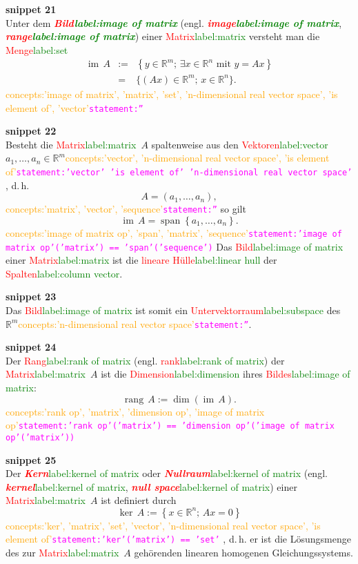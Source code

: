 \documentclass[a4paper,twoside,english,ngerman,deutsch,german,sectrefs,envcountsame,envcountchap]{svmono}
\newcommand{\setref}[2]{\textcolor{red}{#1}\textcolor{green}{#2}}
\newcommand{\snippet}[1]{\textbf{snippet #1}\\}
\newcommand{\eqnote}[2]{\textcolor{orange}{#1}\textcolor{magenta}{\texttt{#2}}}
\begin{document}
\snippet{21}
Unter dem \textbf{\em \setref{Bild}{label:image of matrix}} (engl. \textbf{\em \setref{image}{label:image of matrix}}, \textbf{\em \setref{range}{label:image of matrix}}) einer \setref{Matrix}{label:matrix} versteht man die \setref{Menge}{label:set}
\[
\begin{array}{lrl}
{\operatorname{im}}\,A & := & \left\{ y\in{\mathbb{R}}^{m};\,\exists x\in{\mathbb{R}}^{n}\textrm{ mit }y=Ax\right\} \\
 & = & \{(Ax)\in{\mathbb{R}}^{m};\,x\in{\mathbb{R}}^{n}\}.
\end{array}
\]\eqnote{concepts:'image of matrix', 'matrix', 'set', 'n-dimensional real vector space', 'is element of', 'vector'}{statement:''}

\snippet{22}
Besteht die \setref{Matrix}{label:matrix}~$A$ spaltenweise aus den \setref{Vektoren}{label:vector} $a_{1},\ldots,a_{n}\in{\mathbb{R}}^{m}$\eqnote{concepts:'vector', 'n-dimensional real vector space', 'is element of'}{statement:'vector' 'is element of' 'n-dimensional real vector space'} , d.\,h.
\[
A=\left(a_{1},\ldots,a_{n}\right),
\]\eqnote{concepts:'matrix', 'vector', 'sequence'}{statement:''}
so gilt
\[
{\operatorname{im}}\,A={\operatorname{span}}\left\{ a_{1},\ldots,a_{n}\right\} .
\]\eqnote{concepts:'image of matrix op', 'span', 'matrix', 'sequence'}{statement:'image of matrix op'('matrix') == 'span'('sequence')}
Das \setref{Bild}{label:image of matrix} einer \setref{Matrix}{label:matrix} ist die \setref{lineare Hülle}{label:linear hull} der \setref{Spalten}{label:column vector}.

\snippet{23}
Das \setref{Bild}{label:image of matrix} ist somit ein \setref{Untervektorraum}{label:subspace} des~${\mathbb{R}}^{m}$\eqnote{concepts:'n-dimensional real vector space'}{statement:''}.



\snippet{24}
Der \setref{Rang}{label:rank of matrix} (engl. \setref{rank}{label:rank of matrix}) der \setref{Matrix}{label:matrix}~$A$ ist die \setref{Dimension}{label:dimension} ihres \setref{Bildes}{label:image of matrix}:
\begin{equation}
{\operatorname{rang}}\,A:=\dim({\operatorname{im}}\,A).\label{eq:rank}
\end{equation}\eqnote{concepts:'rank op', 'matrix', 'dimension op', 'image of matrix op'}{statement:'rank op'('matrix') == 'dimension op'('image of matrix op'('matrix'))}

\snippet{25}
Der \setref{\textbf{\em Kern}}{label:kernel of matrix} oder \setref{\textbf{\em Nullraum}}{label:kernel of matrix} (engl. \setref{\textbf{\em kernel}}{label:kernel of matrix}, \setref{\textbf{\em null space}}{label:kernel of matrix}) einer \setref{Matrix}{label:matrix}~$A$ ist definiert durch
\[
\ker\,A:=\left\{ x\in{\mathbb{R}}^{n};\,Ax=0\right\}
\]\eqnote{concepts:'ker', 'matrix', 'set', 'vector', 'n-dimensional real vector space', 'is element of'}{statement:'ker'('matrix') == 'set'} ,
d.\,h. er ist die Lösungsmenge des zur \setref{Matrix}{label:matrix}~$A$ gehörenden linearen homogenen Gleichungssystems.
\end{document}
